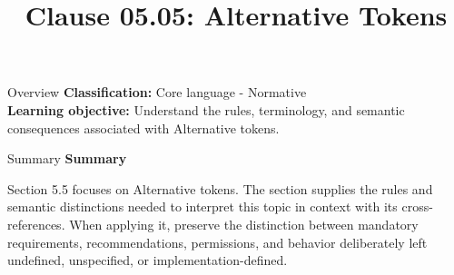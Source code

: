 \documentclass[10pt,letterpaper]{article}
\title{Clause 05.05: Alternative Tokens}
\author{}
\date{}
\begin{document}
\maketitle
\begin{CornellOverviewBox}{Overview}
\textbf{Classification:} Core language - Normative\\[2pt]
\textbf{Learning objective:} Understand the rules, terminology, and semantic consequences associated with Alternative tokens.
\end{CornellOverviewBox}\begin{CornellSummaryBox}{Summary}
{\sffamily\bfseries\color{Accent} Summary}\par\vspace{3pt}Section 5.5 focuses on Alternative tokens. The section supplies the rules and semantic distinctions needed to interpret this topic in context with its cross-references. When applying it, preserve the distinction between mandatory requirements, recommendations, permissions, and behavior deliberately left undefined, unspecified, or implementation-defined.
\end{CornellSummaryBox}
\end{document}
